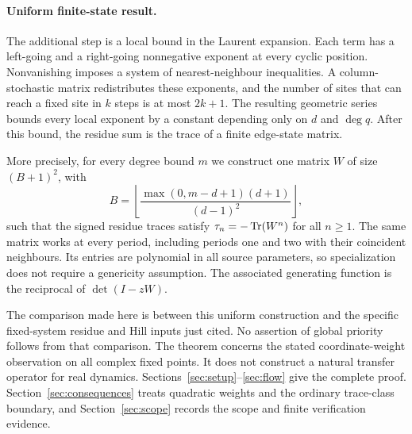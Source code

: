 \paragraph{Uniform finite-state result.}
The additional step is a local bound in the Laurent expansion. Each term
has a left-going and a right-going nonnegative exponent at every cyclic
position. Nonvanishing imposes a system of nearest-neighbour inequalities.
A column-stochastic matrix redistributes these exponents, and the number
of sites that can reach a fixed site in $k$ steps is at most $2k+1$.
The resulting geometric series bounds every local exponent by a constant
depending only on $d$ and $\deg q$. After this bound, the residue sum is
the trace of a finite edge-state matrix.

More precisely, for every degree bound $m$ we construct one matrix $W$ of
size $(B+1)^2$, with
\[
 B=\left\lfloor
 \frac{\max(0,m-d+1)(d+1)}{(d-1)^2}
 \right\rfloor,
\]
such that the signed residue traces satisfy $\tau_n=-\operatorname{Tr}(W^n)$ for all
$n\ge1$. The same matrix works at every period, including periods one and
two with their coincident neighbours. Its entries are polynomial in all
source parameters, so specialization does not require a genericity
assumption. The associated generating function is the reciprocal of
$\det(I-zW)$.

The comparison made here is between this uniform construction and the
specific fixed-system residue and Hill inputs just cited. No assertion
of global priority follows from that comparison. The theorem concerns
the stated coordinate-weight observation on all complex fixed points.
It does not construct a natural transfer operator for real dynamics.
Sections~\ref{sec:setup}--\ref{sec:flow} give the complete proof.
Section~\ref{sec:consequences} treats quadratic weights and the ordinary
trace-class boundary, and Section~\ref{sec:scope} records the scope and
finite verification evidence.
